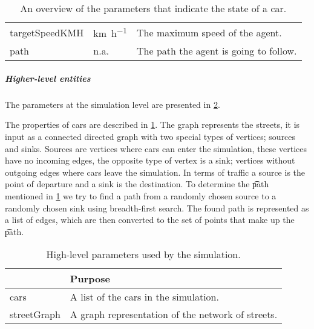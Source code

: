 \begin{table}
\begin{tabularx}{\textwidth}{>{\ttfamily}llX}
			targetSpeedKMH			
				& \si{\kilo\meter\per\hour}
				& The maximum speed of the agent. \\ 
			path					
				& n.a. 
				& The path the agent is going to follow. \\ 
			\bottomrule
		\end{tabularx}
		\caption{An overview of the parameters that indicate the state of a car.}
		\label{tab:par:method:model:overview:state:lowlevel:car}
	\end{table}

	\subparagraph{Higher-level entities}
	The parameters at the simulation level are presented in \cref{tab:par:method:model:overview:state:highlevel:sim}.

	The properties of cars are described in \cref{tab:par:method:model:overview:state:lowlevel:car}. The graph represents the streets, it is input as a connected directed graph with two special types of vertices; sources and sinks. Sources are vertices where cars can enter the simulation, these vertices have no incoming edges, the opposite type of vertex is a sink; vertices without outgoing edges where cars leave the simulation. In terms of traffic a source is the point of departure and a sink is the destination. To determine the \t{path} mentioned in \cref{tab:par:method:model:overview:state:lowlevel:car} we try to find a path from a randomly chosen source to a randomly chosen sink using breadth-first search. The found path is represented as a list of edges, which are then converted to the set of points that make up the \t{path}.
	
	\begin{table}[H]
		\centering
		\begin{tabularx}{\textwidth}{>{\ttfamily}lX}
			\toprule
			\normalfont{Parameter}	& Purpose \\  
			\midrule
			cars 					& A list of the cars in the simulation. \\ 
			streetGraph		 		& A graph representation of the network of streets. \\ 
			\bottomrule
		\end{tabularx}
		\caption{High-level parameters used by the simulation.}
		\label{tab:par:method:model:overview:state:highlevel:sim}
	\end{table}


